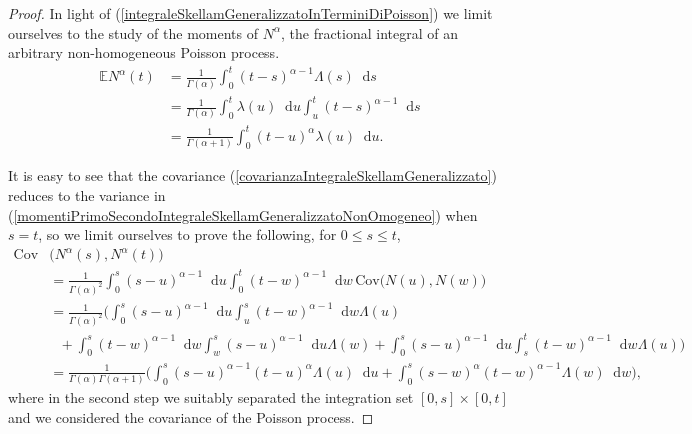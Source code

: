\documentclass[10pt,a4paper]{amsart}
\newcommand*\dif{\mathop{}\!\mathrm{d}}  %
\begin{document}
\begin{proof}
In light of (\ref{integraleSkellamGeneralizzatoInTerminiDiPoisson}) we limit ourselves to the study of the moments of $N^\alpha$, the fractional integral of an arbitrary non-homogeneous Poisson process.
\begin{align*}
\mathbb{E}N^\alpha(t) &= \frac{1}{\Gamma(\alpha)}\int_0^t (t-s)^{\alpha-1} \Lambda(s)\dif s \\
&=\frac{1}{\Gamma(\alpha)}\int_0^t  \lambda(u)\dif u \int_u^t(t-s)^{\alpha-1} \dif s\\ 
& = \frac{1}{\Gamma(\alpha+1)}\int_0^t (t-u)^{\alpha}
 \lambda(u)\dif u.
\end{align*}

It is easy to see that the covariance (\ref{covarianzaIntegraleSkellamGeneralizzato}) reduces to the variance in (\ref{momentiPrimoSecondoIntegraleSkellamGeneralizzatoNonOmogeneo}) when $s=t$, so we limit ourselves to prove the following, for $0\le s\le t$,
\begin{align*}
 \text{Cov}&\Big(N^\alpha(s), N^\alpha(t)\Big)\\
& =  \frac{1}{\Gamma(\alpha)^2}\int_0^s (s-u)^{\alpha-1} \dif u \int_0^t(t-w)^{\alpha-1} \dif w\,  \text{Cov}\Big(N(u), N(w)\Big)\\
& = \frac{1}{\Gamma(\alpha)^2} \Biggl( \int_0^s (s-u)^{\alpha-1} \dif u \int_u^s(t-w)^{\alpha-1} \dif w \Lambda(u) \\
&\ \ \ + \int_0^s (t-w)^{\alpha-1} \dif w \int_w^s(s-u)^{\alpha-1} \dif u \Lambda(w) + \int_0^s (s-u)^{\alpha-1} \dif u \int_s^t(t-w)^{\alpha-1} \dif w \Lambda(u)\Biggr)\\
& =  \frac{1}{\Gamma(\alpha)\Gamma(\alpha+1)}\Biggl( \int_0^s (s-u)^{\alpha-1}(t-u)^{\alpha}\Lambda(u)\dif u +  \int_0^s (s-w)^{\alpha}(t-w)^{\alpha-1}\Lambda(w)\dif w \Biggr),
\end{align*}
where in the second step we suitably separated the integration set $[0,s]\times[0,t]$ and we considered the covariance of the Poisson process.
\end{proof}
\end{document}
